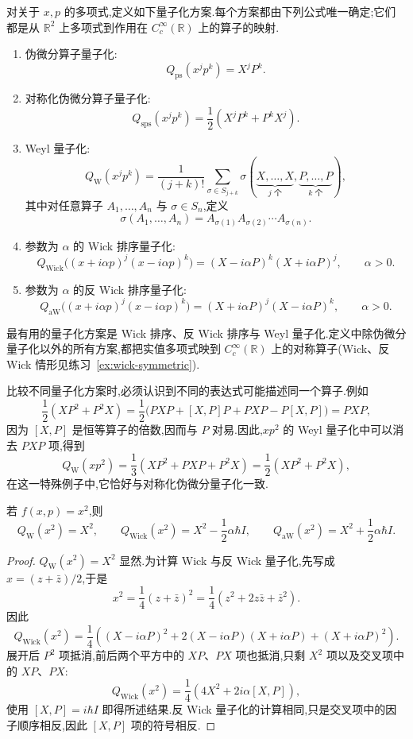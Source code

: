 \begin{definition}[几种量子化方案]\label{def:quantization-schemes}
对关于 $x,p$ 的多项式,定义如下量子化方案.每个方案都由下列公式唯一确定;它们都是从 $\mathbb R^2$ 上多项式到作用在 $C_c^\infty(\mathbb R)$ 上的算子的映射.
\begin{enumerate}
\item 伪微分算子量子化:
\[
Q_{\mathrm{ps}}(x^jp^k)=X^jP^k.
\]
\item 对称化伪微分算子量子化:
\[
Q_{\mathrm{sps}}(x^jp^k)=\frac12(X^jP^k+P^kX^j).
\]
\item Weyl 量子化:
\[
Q_{\mathrm W}(x^jp^k)=\frac1{(j+k)!}\sum_{\sigma\in S_{j+k}}
\sigma(\underbrace{X,\ldots,X}_{j\text{ 个}},\underbrace{P,\ldots,P}_{k\text{ 个}}),
\]
其中对任意算子 $A_1,\ldots,A_n$ 与 $\sigma\in S_n$,定义
\[
\sigma(A_1,\ldots,A_n)=A_{\sigma(1)}A_{\sigma(2)}\cdots A_{\sigma(n)}.
\label{eq:permutation-operator-order}
\]
\item 参数为 $\alpha$ 的 Wick 排序量子化:
\[
Q_{\mathrm{Wick}}\bigl((x+i\alpha p)^j(x-i\alpha p)^k\bigr)
=(X-i\alpha P)^k(X+i\alpha P)^j,
\qquad \alpha>0.
\]
\item 参数为 $\alpha$ 的反 Wick 排序量子化:
\[
Q_{\mathrm{aW}}\bigl((x+i\alpha p)^j(x-i\alpha p)^k\bigr)
=(X+i\alpha P)^j(X-i\alpha P)^k,
\qquad \alpha>0.
\]
\end{enumerate}
最有用的量子化方案是 Wick 排序、反 Wick 排序与 Weyl 量子化.定义中除伪微分量子化以外的所有方案,都把实值多项式映到 $C_c^\infty(\mathbb R)$ 上的对称算子(Wick、反 Wick 情形见练习~\ref{ex:wick-symmetric}).
\end{definition}

比较不同量子化方案时,必须认识到不同的表达式可能描述同一个算子.例如
\[
\frac12(XP^2+P^2X)
=\frac12\bigl(PXP+[X,P]P+PXP-P[X,P]\bigr)=PXP,
\]
因为 $[X,P]$ 是恒等算子的倍数,因而与 $P$ 对易.因此,$xp^2$ 的 Weyl 量子化中可以消去 $PXP$ 项,得到
\[
Q_{\mathrm W}(xp^2)=\frac13(XP^2+PXP+P^2X)
=\frac12(XP^2+P^2X),
\label{eq:weyl-xp2}
\]
在这一特殊例子中,它恰好与对称化伪微分量子化一致.

\begin{example}[$x^2$ 的不同量子化]\label{ex:quantization-x2}
若 $f(x,p)=x^2$,则
\[
Q_{\mathrm W}(x^2)=X^2,
\qquad
Q_{\mathrm{Wick}}(x^2)=X^2-\frac12\alpha\hbar I,
\qquad
Q_{\mathrm{aW}}(x^2)=X^2+\frac12\alpha\hbar I.
\]
\end{example}

\begin{proof}
$Q_{\mathrm W}(x^2)=X^2$ 显然.为计算 Wick 与反 Wick 量子化,先写成 $x=(z+\bar z)/2$,于是
\[
x^2=\frac14(z+\bar z)^2=\frac14(z^2+2z\bar z+\bar z^2).
\]
因此
\[
Q_{\mathrm{Wick}}(x^2)=\frac14\left((X-i\alpha P)^2
+2(X-i\alpha P)(X+i\alpha P)+(X+i\alpha P)^2\right).
\]
展开后 $P^2$ 项抵消,前后两个平方中的 $XP$、$PX$ 项也抵消,只剩 $X^2$ 项以及交叉项中的 $XP$、$PX$:
\[
Q_{\mathrm{Wick}}(x^2)=\frac14\left(4X^2+2i\alpha[X,P]\right),
\]
使用 $[X,P]=i\hbar I$ 即得所述结果.反 Wick 量子化的计算相同,只是交叉项中的因子顺序相反,因此 $[X,P]$ 项的符号相反.
\end{proof}

